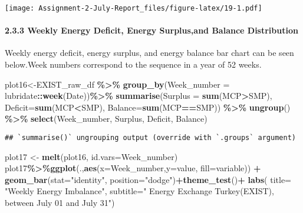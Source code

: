 \documentclass[
]{article}
\newenvironment{Shaded}{\begin{snugshade}}{\end{snugshade}}
\newcommand{\DataTypeTok}[1]{\textcolor[rgb]{0.13,0.29,0.53}{#1}}
\newcommand{\KeywordTok}[1]{\textcolor[rgb]{0.13,0.29,0.53}{\textbf{#1}}}
\newcommand{\NormalTok}[1]{#1}
\newcommand{\OperatorTok}[1]{\textcolor[rgb]{0.81,0.36,0.00}{\textbf{#1}}}
\newcommand{\StringTok}[1]{\textcolor[rgb]{0.31,0.60,0.02}{#1}}
\begin{document}
\texttt{[image: Assignment-2-July-Report\_files/figure-latex/19-1.pdf]}

\hypertarget{weekly-energy-deficit-energy-surplusand-balance-distribution}{%
\paragraph{2.3.3 Weekly Energy Deficit, Energy Surplus,and Balance
Distribution}\label{weekly-energy-deficit-energy-surplusand-balance-distribution}}

Weekly energy deficit, energy surplus, and energy balance bar chart can
be seen below.Week numbers correspond to the sequence in a year of 52
weeks.

\begin{Shaded}
\begin{Highlighting}[]
\NormalTok{plot16\textless{}{-}EXIST\_raw\_df }\OperatorTok{\%\textgreater{}\%}\StringTok{ }\KeywordTok{group\_by}\NormalTok{(}\DataTypeTok{Week\_number =}\NormalTok{ lubridate}\OperatorTok{::}\KeywordTok{week}\NormalTok{(Date))}\OperatorTok{\%\textgreater{}\%}\StringTok{ }
\KeywordTok{summarise}\NormalTok{(}\DataTypeTok{Surplus =} \KeywordTok{sum}\NormalTok{(MCP}\OperatorTok{\textgreater{}}\NormalTok{SMP), }\DataTypeTok{Deficit=}\KeywordTok{sum}\NormalTok{(MCP}\OperatorTok{\textless{}}\NormalTok{SMP), }\DataTypeTok{Balance=}\KeywordTok{sum}\NormalTok{(MCP}\OperatorTok{==}\NormalTok{SMP)) }\OperatorTok{\%\textgreater{}\%}\StringTok{ }\KeywordTok{ungroup}\NormalTok{() }\OperatorTok{\%\textgreater{}\%}
\KeywordTok{select}\NormalTok{(Week\_number, Surplus, Deficit, Balance) }
\end{Highlighting}
\end{Shaded}

\begin{verbatim}
## `summarise()` ungrouping output (override with `.groups` argument)
\end{verbatim}

\begin{Shaded}
\begin{Highlighting}[]
\NormalTok{plot17 \textless{}{-}}\StringTok{ }\KeywordTok{melt}\NormalTok{(plot16, }\DataTypeTok{id.vars=}\StringTok{\textquotesingle{}Week\_number\textquotesingle{}}\NormalTok{)}
\NormalTok{plot17}\OperatorTok{\%\textgreater{}\%}\KeywordTok{ggplot}\NormalTok{(.,}\KeywordTok{aes}\NormalTok{(}\DataTypeTok{x=}\NormalTok{Week\_number,}\DataTypeTok{y=}\NormalTok{value, }\DataTypeTok{fill=}\NormalTok{variable)) }\OperatorTok{+}\StringTok{ }\KeywordTok{geom\_bar}\NormalTok{(}\DataTypeTok{stat=}\StringTok{"identity"}\NormalTok{, }\DataTypeTok{position=}\StringTok{"dodge"}\NormalTok{)}\OperatorTok{+}\KeywordTok{theme\_test}\NormalTok{()}\OperatorTok{+}
\StringTok{      }\KeywordTok{labs}\NormalTok{( }\DataTypeTok{title=}  \StringTok{"Weekly Energy Imbalance"}\NormalTok{,}
            \DataTypeTok{subtitle=}\StringTok{" Energy Exchange Turkey(EXIST), between July 01 and July 31"}\NormalTok{)}
\end{Highlighting}
\end{Shaded}
\end{document}
